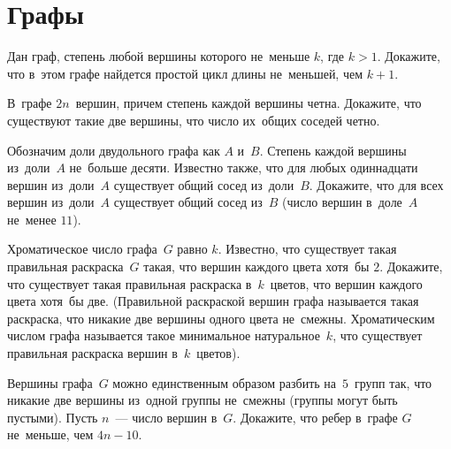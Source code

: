 
\section*{Графы}


\begin{problems}


\item
Дан граф, степень любой вершины которого не~меньше $k$, где $k > 1$.
Докажите, что в~этом графе найдется простой цикл длины не~меньшей, чем $k + 1$.

\item
В~графе $2 n$~вершин, причем степень каждой вершины четна.
Докажите, что существуют такие две вершины, что число их~общих соседей четно.

\item
Обозначим доли двудольного графа как $A$ и~$B$.
Степень каждой вершины из~доли~$A$ не~больше десяти.
Известно также, что для любых одиннадцати вершин из~доли~$A$ существует общий
сосед из~доли~$B$.
Докажите, что для всех вершин из~доли~$A$ существует общий сосед из~$B$
(число вершин в~доле~$A$ не~менее $11$).

\item
Хроматическое число графа~$G$ равно $k$.
Известно, что существует такая правильная раскраска~$G$ такая, что вершин
каждого цвета хотя~бы $2$.
Докажите, что существует такая правильная раскраска в~$k$~цветов, что вершин
каждого цвета хотя~бы две.
(Правильной раскраской вершин графа называется такая раскраска, что никакие две
вершины одного цвета не~смежны.
Хроматическим числом графа называется такое минимальное натуральное~$k$, что
существует правильная раскраска вершин в~$k$~цветов).

\item
Вершины графа~$G$ можно единственным образом разбить на~$5$~групп так, что
никакие две вершины из~одной группы не~смежны (группы могут быть пустыми).
Пусть $n$~— число вершин в~$G$.
Докажите, что ребер в~графе $G$ не~меньше, чем $4 n - 10$.


\end{problems}
